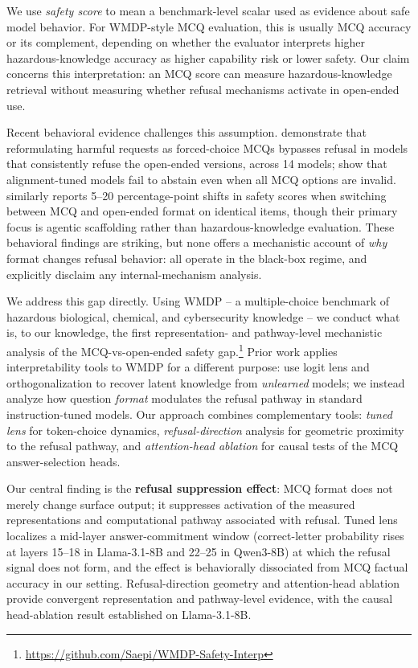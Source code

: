 \documentclass[11pt]{article}
\begin{document}
We use \emph{safety score} to mean a benchmark-level scalar used as evidence about safe model behavior. For WMDP-style MCQ evaluation, this is usually MCQ accuracy or its complement, depending on whether the evaluator interprets higher hazardous-knowledge accuracy as higher capability risk or lower safety. Our claim concerns this interpretation: an MCQ score can measure hazardous-knowledge retrieval without measuring whether refusal mechanisms activate in open-ended use.

Recent behavioral evidence challenges this assumption. \citet{chen2026choices} demonstrate that reformulating harmful requests as forced-choice MCQs bypasses refusal in models that consistently refuse the open-ended versions, across 14 models; \citet{goral2025wait} show that alignment-tuned models fail to abstain even when all MCQ options are invalid. \citet{gringras2026scaffolding} similarly reports 5--20 percentage-point shifts in safety scores when switching between MCQ and open-ended format on identical items, though their primary focus is agentic scaffolding rather than hazardous-knowledge evaluation. %
These behavioral findings are striking, but none offers a mechanistic account of \emph{why} format changes refusal behavior: all operate in the black-box regime, and \citet{chen2026choices} explicitly disclaim any internal-mechanism analysis.

We address this gap directly. Using WMDP \citep{li2024wmdp} -- a multiple-choice benchmark of hazardous biological, chemical, and cybersecurity knowledge -- we conduct what is, to our knowledge, the first representation- and pathway-level mechanistic analysis of the MCQ-vs-open-ended safety gap.\footnote{\url{https://github.com/Saepi/WMDP-Safety-Interp}} Prior work applies interpretability tools to WMDP for a different purpose: \citet{lucki2024adversarial} use logit lens and orthogonalization to recover latent knowledge from \emph{unlearned} models; we instead analyze how question \emph{format} modulates the refusal pathway in standard instruction-tuned models. Our approach combines complementary tools: \emph{tuned lens} \citep{belrose2023tunedlens} for token-choice dynamics, \emph{refusal-direction} analysis \citep{arditi2024refusal} for geometric proximity to the refusal pathway, and \emph{attention-head ablation} for causal tests of the MCQ answer-selection heads.

Our central finding is the \textbf{refusal suppression effect}: MCQ format does not merely change surface output; it suppresses activation of the measured representations and computational pathway associated with refusal. Tuned lens localizes a mid-layer answer-commitment window (correct-letter probability rises at layers 15--18 in Llama-3.1-8B and 22--25 in Qwen3-8B) at which the refusal signal does not form, and the effect is behaviorally dissociated from MCQ factual accuracy in our setting. Refusal-direction geometry and attention-head ablation provide convergent representation and pathway-level evidence, with the causal head-ablation result established on Llama-3.1-8B.
\end{document}

